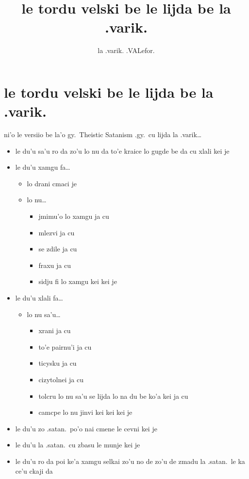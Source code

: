 \documentclass{article}
\title{le tordu velski be le lijda be la .varik.}
\author{la .varik. .VALefor.}
\begin{document}
\maketitle

\section{le tordu velski be le lijda be la .varik.}

ni'o le versiio be la'o gy.\ Theistic Satanism .gy.\ cu lijda la .varik\ldots

\begin{itemize}
	\item le du'u sa'u ro da zo'u lo nu da to'e kraice lo gugde be da cu xlali kei je
	\item le du'u xamgu fa\ldots{}
	\begin{itemize}
		\item lo drani cmaci je
		\item lo nu\ldots{}
		\begin{itemize}
			\item jmimu'o lo xamgu ja cu
			\item mlezvi ja cu
			\item se zdile ja cu
			\item fraxu ja cu
			\item sidju fi lo xamgu kei kei je
		\end{itemize}
	\end{itemize}
	\item le du'u xlali fa\ldots{}
	\begin{itemize}
		\item lo nu sa'u\ldots{}
		\begin{itemize}
			\item xrani ja cu
			\item to'e pairnu'i ja cu
			\item ticysku ja cu
			\item cizytolnei ja cu
			\item tolcru lo nu sa'u se lijda lo na du be ko'a kei ja cu
			\item camcpe lo nu jinvi kei kei kei je
		\end{itemize}
	\end{itemize}
	\item le du'u zo .satan.\ po'o nai cmene le cevni kei je
	\item le du'u la .satan.\ cu zbasu le munje kei je
	\item le du'u ro da poi ke'a xamgu selkai zo'u no de zo'u de zmadu la .satan.\ le ka ce'u ckaji da
\end{itemize}
\end{document}
